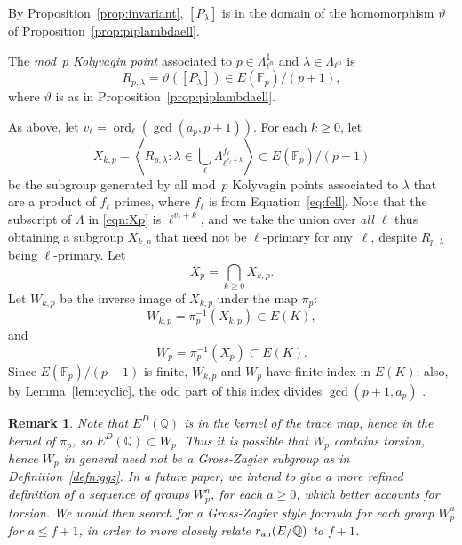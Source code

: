 \documentclass{oupau}
\DeclareMathOperator{\ord}{ord}
\newcommand{\an}{{\rm an}}
\newcommand{\FF}{\mathbb{F}}
\newcommand{\QQ}{\mathbb{Q}}
\newtheorem{remark}[theorem]{Remark}
\begin{document}
By Proposition~\ref{prop:invariant}, $[P_{\lambda}]$ is in the
domain of the homomorphism $\vartheta$ of Proposition~\ref{prop:piplambdaell}.
\begin{definition}
The {\em mod~$p$ Kolyvagin point} associated to $p\in \Lambda_{\ell^n}^1$ and
$\lambda\in\Lambda_{\ell^n}$ is
$$
  R_{p,\lambda} = \vartheta ( [P_{\lambda}] ) \in E(\FF_p)/(p+1),
$$
where $\vartheta$ is as in Proposition~\ref{prop:piplambdaell}.
\end{definition}
As above, let $v_{\ell} = \ord_{\ell}(\gcd(a_p, p+1))$. For each $k\geq 0$, let
\begin{equation}\label{eqn:Xp}
X_{k,p} = \left\langle R_{p,\lambda} : 
    \lambda \in \bigcup_{\ell} \Lambda_{\ell^{v_{\ell}+k}}^{f_{\ell}} \right\rangle
\subset E(\FF_p)/(p+1)
\end{equation}
be the subgroup generated by all mod~$p$ Kolyvagin points associated
to $\lambda$ that are a product of $f_{\ell}$ primes, where $f_{\ell}$
is from Equation~\eqref{eq:fell}.  Note that the subscript of
$\Lambda$ in \eqref{eqn:Xp} is $\ell^{v_\ell+k}$, and we take the
union over {\em all $\ell$} thus obtaining a subgroup $X_{k,p}$ that
need not be $\ell$-primary for any~$\ell$, despite $R_{p,\lambda}$
being $\ell$-primary.  Let
$$
  X_p = \bigcap_{k\geq 0} X_{k,p}.
$$
Let $W_{k,p}$ be the inverse image of $X_{k,p}$ under the
map $\pi_p$:
$$
  W_{k,p} = \pi_p^{-1}(X_{k,p}) \subset E(K),
$$
and 
$$
  W_{p} = \pi_p^{-1}(X_{p}) \subset E(K).
$$
Since $E(\FF_p)/(p+1)$ is finite, $W_{k,p}$ and $W_p$ have finite index in $E(K)$;
also, by Lemma~\ref{lem:cyclic}, the odd part of this index divides
$\gcd(p+1,a_p)$ .  

\begin{remark}\label{rem:kertr}
  Note that $E^D(\QQ)$ is in the kernel of the trace map, hence in the
  kernel of $\pi_p$, so $E^D(\QQ) \subset W_p$.  Thus it is possible
  that $W_p$ contains torsion, hence $W_p$ in general need not be a
  Gross-Zagier subgroup as in Definition~\ref{defn:ggz}.  In a future
  paper, we intend to give a more refined definition of a sequence of
  groups $W_p^a$, for each $a\geq 0$, which better accounts for
  torsion.  We would then search for a Gross-Zagier style formula for
  each group $W_p^a$ for $a \leq f+1$, in order to more closely relate
  $r_{\an}(E/\QQ)$ to $f+1$.
\end{remark}


\end{document}
